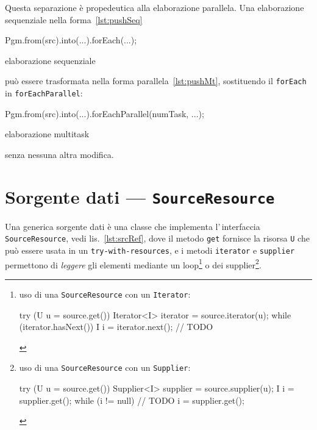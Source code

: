 Questa separazione è propedeutica alla elaborazione parallela.
Una elaborazione sequenziale nella forma~\ref{lst:pushSeq}
\begin{elisting}[!htb]
\begin{javacode}
    Pgm.from(src).into(...).forEach(...);
\end{javacode}
\caption{elaborazione sequenziale}
\label{lst:pushSeq}
\end{elisting}
può essere trasformata nella forma parallela~\ref{lst:pushMt}, sostituendo il
\texttt{forEach} in \texttt{forEachParallel}:
\begin{elisting}[!htb]
\begin{javacode}
    Pgm.from(src).into(...).forEachParallel(numTask, ...);
\end{javacode}
\caption{elaborazione multitask}
\label{lst:pushMt}
\end{elisting}
senza nessuna altra modifica.

\VerbatimFootnotes


\section{Sorgente dati --- \texttt{SourceResource}} \label{sec:srcRes}
Una generica sorgente dati è una classe che implementa l'\,interfaccia
\texttt{SourceResource}, vedi lis.~\ref{lst:srcRef}, dove il metodo \texttt{get}
fornisce la risorsa \texttt{U} che può essere usata in un
\texttt{try-with-resources}, e i metodi \texttt{iterator} e \texttt{supplier}
permettono di \textsl{leggere} gli elementi mediante un loop\footnote{%
    uso di una \texttt{SourceResource} con un \texttt{Iterator}:
    \begin{javacode}
        try (U u = source.get()) {
        Iterator<I> iterator = source.iterator(u);
        while (iterator.hasNext()) {
            I i = iterator.next();
            // TODO
        }
    }
    \end{javacode}
} o dei supplier\footnote{%
    uso di una \texttt{SourceResource} con un \texttt{Supplier}:
    \begin{javacode}
        try (U u = source.get()) {
        Supplier<I> supplier = source.supplier(u);
        I i = supplier.get();
        while (i != null) {
            // TODO
            i = supplier.get();
        }
    }
    \end{javacode}
}.

